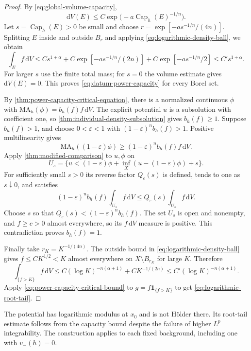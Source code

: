 \begin{proof}
By \eqref{eq:global-volume-capacity},
\[
 \mathrm dV(E)\leq C\exp\bigl(-a\operatorname{Cap}_h(E)^{-1/n}\bigr).
\]
Let $s=\operatorname{Cap}_h(E)>0$ be small and choose $r=\exp[-as^{-1/n}/(4n)]$. Splitting $E$ inside and outside $B_r$ and applying \eqref{eq:logarithmic-density-ball}, we obtain
\[
 \int_Ef\,\mathrm dV
 \leq Cs^{1+\alpha}
       +C\exp[-as^{-1/n}/(2n)]
       +C\exp[-as^{-1/n}/2]
 \leq C's^{1+\alpha}.
\]
For larger $s$ use the finite total mass; for $s=0$ the volume estimate gives $\mathrm dV(E)=0$. This proves \eqref{eq:datum-power-capacity} for every Borel set.

By \cref{thm:power-capacity-critical-equation}, there is a normalized continuous $\phi$ with $\mathrm{MA}_h(\phi)=b_h(f)f\,\mathrm dV$. The explicit potential $u$ is a subsolution with coefficient one, so \cref{thm:individual-density-subsolution} gives $b_h(f)\geq1$. Suppose $b_h(f)>1$, and choose $0<\varepsilon<1$ with $(1-\varepsilon)^nb_h(f)>1$. Positive multilinearity gives
\[
 \mathrm{MA}_h((1-\varepsilon)\phi)
       \geq(1-\varepsilon)^nb_h(f)f\,\mathrm dV.
\]
Apply \cref{thm:modified-comparison} to $u,\phi$ on
\[
 U_s=\{u<(1-\varepsilon)\phi+
                     \inf_X(u-(1-\varepsilon)\phi)+s\}.
\]
For sufficiently small $s>0$ its reverse factor $Q_\varepsilon(s)$ is defined, tends to one as $s\downarrow0$, and satisfies
\[
 (1-\varepsilon)^nb_h(f)\int_{U_s}f\,\mathrm dV
       \leq Q_\varepsilon(s)\int_{U_s}f\,\mathrm dV.
\]
Choose $s$ so that $Q_\varepsilon(s)<(1-\varepsilon)^nb_h(f)$. The set $U_s$ is open and nonempty, and $f\geq c>0$ almost everywhere, so its $f\,\mathrm dV$ measure is positive. This contradiction proves $b_h(f)=1$.

Finally take $r_K=K^{-1/(4n)}$. The outside bound in \eqref{eq:logarithmic-density-ball} gives $f\leq CK^{1/2}<K$ almost everywhere on $X\setminus B_{r_K}$ for large $K$. Therefore
\[
 \int_{\{f>K\}}f\,\mathrm dV
 \leq C(\log K)^{-n(\alpha+1)}+CK^{-1/(2n)}
 \leq C'(\log K)^{-n(\alpha+1)}.
\]
Apply \eqref{eq:power-capacity-critical-bound} to $g=f\mathbf1_{\{f>K\}}$ to get \eqref{eq:logarithmic-root-tail}.
\end{proof}

The potential has logarithmic modulus at $x_0$ and is not H\"older there. Its root-tail estimate follows from the capacity bound despite the failure of higher $L^p$ integrability. The construction applies to each fixed background, including one with $v_-(h)=0$.
